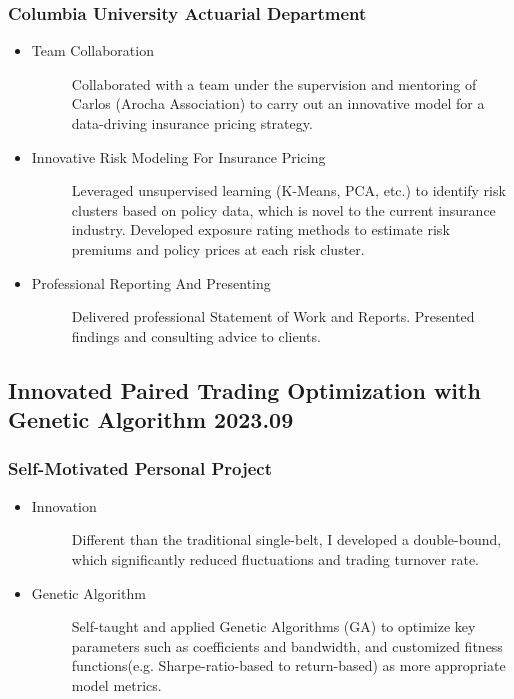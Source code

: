 \documentclass[a4paper]{article}
\begin{document}
\subsubsection{Columbia University Actuarial Department} 
\vspace{3pt}
\begin{itemize}
    \item\begin{description}
        \item[Team Collaboration] Collaborated with a team under the supervision and mentoring of Carlos (Arocha Association) to carry out an innovative model for a data-driving insurance pricing strategy.
    \end{description}
    \item\begin{description}
        \item[Innovative Risk Modeling For Insurance Pricing] Leveraged unsupervised learning (K-Means, PCA, etc.) to identify risk clusters based on policy data, which is novel to the current insurance industry. Developed exposure rating methods to estimate risk premiums and policy prices at each risk cluster. 
    \end{description}
    \item\begin{description}
        \item[Professional Reporting And Presenting] Delivered professional Statement of Work and Reports. Presented findings and consulting advice to clients.
    \end{description}
\end{itemize} 

\subsection{Innovated Paired Trading Optimization with Genetic Algorithm \normalfont \hfill 2023.09}
\subsubsection{Self-Motivated Personal Project}
\begin{itemize}
    \item\begin{description}
        \item[Innovation] Different than the traditional single-belt, I developed a double-bound, which significantly reduced fluctuations and trading turnover rate. 
    \end{description}
    \item\begin{description}
        \item[Genetic Algorithm] Self-taught and applied Genetic Algorithms (GA) to optimize key parameters such as coefficients and bandwidth, and customized fitness functions(e.g. Sharpe-ratio-based to return-based) as more appropriate model metrics. 
    \end{description}
\end{itemize}
\end{document}

